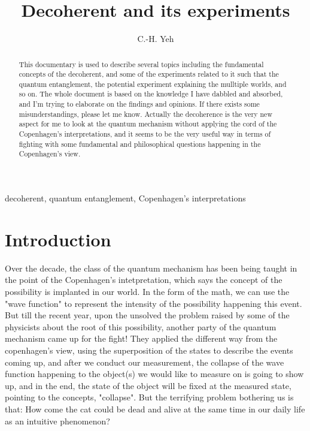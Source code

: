 \documentclass[final,1p,12pt]{elsarticle}
\begin{document}
\begin{frontmatter}

\title{Decoherent and its experiments}

\author[add3]{C.-H. Yeh}



\address[add3]{
Department of Physics and Center for High Energy and High Field Physics, 
National Central University, Chung-Li, Taoyuan City 32001, Taiwan
}





\begin{abstract}
This documentary is used to describe several topics including the fundamental concepts of the decoherent, and some of the experiments related to it such that the quantum entanglement, the potential experiment explaining the mulltiple worlds, and so on. The whole document is based on the knowledge I have dabbled and absorbed, and I'm trying to elaborate on the findings and opinions. If there exists some misunderstandings, please let me know. Actually the decoherence is the very new aspect for me to look at the quantum mechanism without applying the cord of the Copenhagen's interpretations, and it seems to be the very useful way in terms of fighting with some fundamental and philosophical questions happening in the Copenhagen's view. 
\end{abstract}

\begin{keyword}
decoherent, quantum entanglement, Copenhagen's interpretations
\end{keyword}
\end{frontmatter}
\tableofcontents



\section{Introduction}
Over the decade, the class of the quantum mechanism has been being taught in the point of the Copenhagen's intetpretation, which says the concept of the possibility is implanted in our world. In the form of the math, we can use the "wave function" to represent the intensity of the possibility happening this event. But till the recent year, upon the unsolved the problem raised by some of the physicists about the root of this possibility,  another party of the quantum mechanism came up for the fight! They applied the different way from the copenhagen's view,  using the superposition of the states to describe the events coming up, and after we conduct our measurement, the collapse of the wave function happening to the object(s) we would like to measure on is going to show up, and in the end, the state of the object will be fixed at the measured state, pointing to the concepts, "collapse". But the terrifying problem bothering us is that: How come the cat could be dead and alive at the same time in our daily life as an intuitive phenomenon?\\
\end{document}

